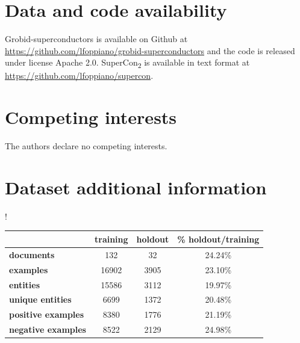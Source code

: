 \documentclass[]{interact}
\theoremstyle{plain}%
\theoremstyle{definition}
\theoremstyle{remark}
\begin{document}

\section*{Data and code availability}
Grobid-superconductors is available on Github at \url{https://github.com/lfoppiano/grobid-superconductors} and the code is released under license Apache 2.0. 
SuperCon\textsubscript{2} is available in text format at \url{https://github.com/lfoppiano/supercon}. 


\section*{Competing interests}

The authors declare no competing interests.





\appendix

\section{Dataset additional information}

\begin{table}[ht]!
    \centering
    {
        \begin{tabular}{lccc}
            \toprule
                                          & \textbf{training} & \textbf{holdout} & \textbf{\% holdout/training} \\
            \midrule
            \textbf{documents}         & 132               & 32               & 24.24\%                   \\
            \textbf{examples}          & 16902             & 3905             & 23.10\%                   \\
            \textbf{entities}          & 15586             & 3112             & 19.97\%                   \\
            \textbf{unique entities}   & 6699              & 1372             & 20.48\%                   \\
            \textbf{positive examples} & 8380              & 1776             & 21.19\%                   \\
            \textbf{negative examples} & 8522              & 2129             & 24.98\%                   \\
            \bottomrule
        \end{tabular}
    }
    \label{tab:training-holdout-set-distribution-annex}
\end{table}
\end{document}
